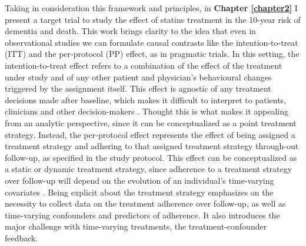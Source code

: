 \documentclass[
]{book}
\begin{document}
Taking in consideration this framework and principles, in \textbf{Chapter \ref{chapter2}} I present a target trial to study the effect of statins treatment in the 10-year risk of dementia and death. This work brings clarity to the idea that even in observational studies we can formulate causal contrasts like the intention-to-treat (ITT) and the per-protocol (PP) effect, as in pragmatic trials. In this setting, the intention-to-treat effect refers to a combination of the effect of the treatment under study and of any other patient and physician's behavioural changes triggered by the assignment itself. This effect is agnostic of any treatment decisions made after baseline, which makes it difficult to interpret to patients, clinicians and other decision-makers \autocite{murray2019,murray2018}. Thought this is what makes it appealing from an analytic perspective, since it can be conceptualized as a point treatment strategy. Instead, the per-protocol effect represents the effect of being assigned a treatment strategy and adhering to that assigned treatment strategy through-out follow-up, as specified in the study protocol. This effect can be conceptualized as a static or dynamic treatment strategy, since adherence to a treatment strategy over follow-up will depend on the evolution of an individual's time-varying covariates \autocite{whatif2020}. Being explicit about the treatment strategy emphasizes on the necessity to collect data on the treatment adherence over follow-up, as well as time-varying confounders and predictors of adherence. It also introduces the major challenge with time-varying treatments, the treatment-confounder feedback.
\end{document}
